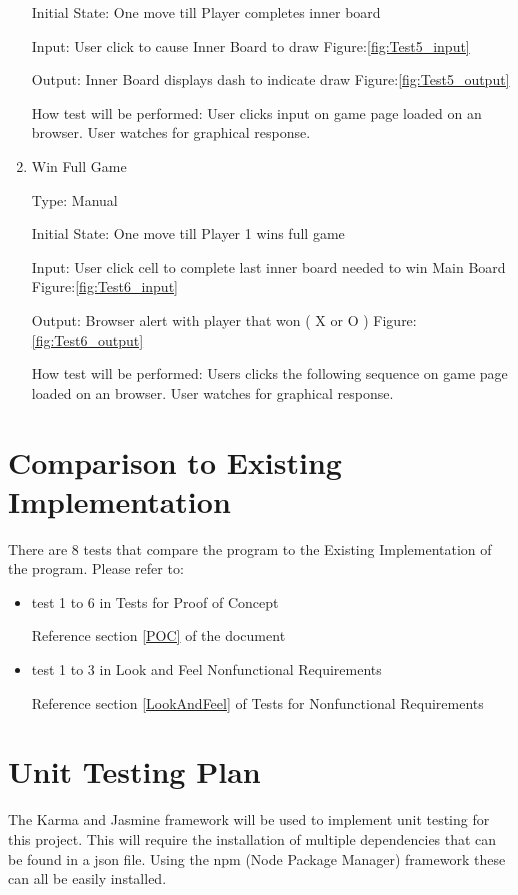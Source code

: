 \documentclass[12pt, titlepage]{article}
\begin{document}
\begin{enumerate}
Initial State: One move till Player completes inner board
					
Input: User click to cause Inner Board to draw Figure:\ref{fig:Test5_input}
					
Output:  Inner Board displays dash to indicate draw Figure:\ref{fig:Test5_output}
					
How test will be performed: User clicks input on game page loaded on an
browser. User watches for graphical response.

\item{Win Full Game\\}

Type: Manual
					
Initial State: One move till Player 1 wins full game
					
Input: User click cell to complete last inner board needed to win Main Board
Figure:\ref{fig:Test6_input}
					
Output:  Browser alert with player that won ( X or O ) Figure:\ref{fig:Test6_output}
					
How test will be performed: Users clicks the following sequence on game page
loaded on an browser. User watches for graphical response.

\end{enumerate}
	
\section{Comparison to Existing Implementation}
There are 8 tests that compare the program to the Existing Implementation of
the program. Please refer to:
\begin{itemize}

\item test 1 to 6 in Tests for Proof of Concept

Reference section \ref{POC} of the document
\item test 1 to 3 in Look and Feel Nonfunctional Requirements

Reference section \ref{LookAndFeel} of Tests for Nonfunctional Requirements

\end{itemize}		
				
\section{Unit Testing Plan}
The Karma and Jasmine framework will be used to implement unit testing for
this project. This will require the installation of multiple dependencies that
can be found in a json file. Using the npm (Node Package Manager) framework 
these can all be easily installed.
\end{document}
